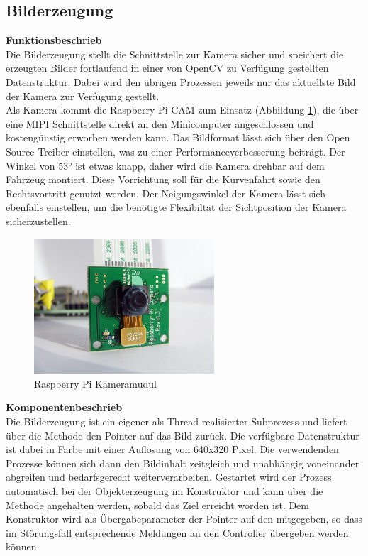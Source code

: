 \subsection{Bilderzeugung}
\textbf{Funktionsbeschrieb}\\[0.2cm]
Die Bilderzeugung stellt die Schnittstelle zur Kamera sicher und speichert die erzeugten Bilder fortlaufend in einer von OpenCV zu Verfügung gestellten Datenstruktur. Dabei wird den übrigen Prozessen jeweils nur das aktuellste Bild der Kamera zur Verfügung gestellt.\\
Als Kamera kommt die Raspberry Pi CAM zum Einsatz (Abbildung \ref{fig:camera}), die über eine MIPI Schnittstelle direkt an den Minicomputer angeschlossen und kostengünstig erworben werden kann. Das Bildformat lässt sich über den Open Source Treiber einstellen, was zu einer Performanceverbesserung beiträgt. Der Winkel von 53° ist etwas knapp, daher wird die Kamera drehbar auf dem Fahrzeug montiert. Diese Vorrichtung soll für die Kurvenfahrt sowie den Rechtsvortritt genutzt werden. Der Neigungswinkel der Kamera lässt sich ebenfalls einstellen, um die benötigte Flexibiltät der Sichtposition der Kamera sicherzustellen.
\begin{figure}[H]
\centering
\includegraphics[width=0.6\textwidth]{03_Loesungskonzept/pictures/raspberry-pi-camera-module.jpg}
\caption{Raspberry Pi Kameramudul}
\label{fig:camera}
\end{figure}
\textbf{Komponentenbeschrieb}\\[0.2cm]
Die Bilderzeugung ist ein eigener als Thread realisierter Subprozess und liefert über die Methode  den Pointer auf das Bild zurück. Die verfügbare Datenstruktur ist dabei  in Farbe mit einer Auflösung von 640x320 Pixel. Die verwendenden Prozesse können sich dann den Bildinhalt zeitgleich und unabhängig voneinander abgreifen und bedarfsgerecht weiterverarbeiten. Gestartet wird der Prozess automatisch bei der Objekterzeugung im Konstruktor und kann über die Methode  angehalten werden, sobald das Ziel erreicht worden ist. Dem Konstruktor wird als Übergabeparameter der Pointer auf den  mitgegeben, so dass im Störungsfall entsprechende Meldungen an den Controller übergeben werden können.\\[0.2cm]
